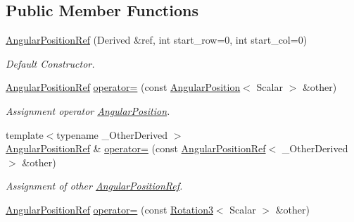 \subsection*{Public Member Functions}
\begin{DoxyCompactItemize}
\item 
\hyperlink{classow__core_1_1AngularPositionRef_a8b05c07e66070ac04810aa52ebefa5a7}{Angular\+Position\+Ref} (Derived \&ref, int start\+\_\+row=0, int start\+\_\+col=0)
\begin{DoxyCompactList}\small\item\em Default Constructor. \end{DoxyCompactList}\item 
\hyperlink{classow__core_1_1AngularPositionRef}{Angular\+Position\+Ref} \hyperlink{classow__core_1_1AngularPositionRef_a0af2c3e086eb2b6f07974d479cc73f0f}{operator=} (const \hyperlink{classow__core_1_1AngularPosition}{Angular\+Position}$<$ Scalar $>$ \&other)\hypertarget{classow__core_1_1AngularPositionRef_a0af2c3e086eb2b6f07974d479cc73f0f}{}\label{classow__core_1_1AngularPositionRef_a0af2c3e086eb2b6f07974d479cc73f0f}

\begin{DoxyCompactList}\small\item\em Assignment operator \hyperlink{classow__core_1_1AngularPosition}{Angular\+Position}. \end{DoxyCompactList}\item 
{\footnotesize template$<$typename \+\_\+\+Other\+Derived $>$ }\\\hyperlink{classow__core_1_1AngularPositionRef}{Angular\+Position\+Ref} \& \hyperlink{classow__core_1_1AngularPositionRef_ad9a7be428a922eee6ce3827c01cd30a9}{operator=} (const \hyperlink{classow__core_1_1AngularPositionRef}{Angular\+Position\+Ref}$<$ \+\_\+\+Other\+Derived $>$ \&other)\hypertarget{classow__core_1_1AngularPositionRef_ad9a7be428a922eee6ce3827c01cd30a9}{}\label{classow__core_1_1AngularPositionRef_ad9a7be428a922eee6ce3827c01cd30a9}

\begin{DoxyCompactList}\small\item\em Assignment of other \hyperlink{classow__core_1_1AngularPositionRef}{Angular\+Position\+Ref}. \end{DoxyCompactList}\item 
\hyperlink{classow__core_1_1AngularPositionRef}{Angular\+Position\+Ref} \hyperlink{classow__core_1_1AngularPositionRef_a485392e8d7b01fb5c556ede9505bc64f}{operator=} (const \hyperlink{classow__core_1_1Rotation3}{Rotation3}$<$ Scalar $>$ \&other)\hypertarget{classow__core_1_1AngularPositionRef_a485392e8d7b01fb5c556ede9505bc64f}{}\label{classow__core_1_1AngularPositionRef_a485392e8d7b01fb5c556ede9505bc64f}


\end{DoxyCompactItemize}
